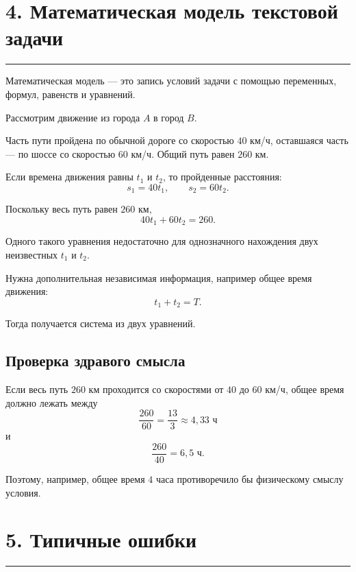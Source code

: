 \documentclass[a4paper,12pt]{article}
\newcommand{\sectionline}{%
  \par
  \noindent
  \color{accent}\rule{\linewidth}{0.45pt}
  \color{textgray}
  \par
}
\begin{document}
\section*{4. Математическая модель текстовой задачи}
\sectionline

Математическая модель --- это запись условий задачи с помощью переменных, формул, равенств и уравнений.

Рассмотрим движение из города $A$ в город $B$.

Часть пути пройдена по обычной дороге со скоростью $40$ км/ч, оставшаяся часть --- по шоссе со скоростью $60$ км/ч. Общий путь равен $260$ км.

Если времена движения равны $t_1$ и $t_2$, то пройденные расстояния:
\[
s_1=40t_1,
\qquad
s_2=60t_2.
\]

Поскольку весь путь равен $260$ км,
\[
40t_1+60t_2=260.
\]

\begin{warningbox}
Одного такого уравнения недостаточно для однозначного нахождения двух неизвестных $t_1$ и $t_2$.

Нужна дополнительная независимая информация, например общее время движения:
\[
t_1+t_2=T.
\]

Тогда получается система из двух уравнений.
\end{warningbox}

\subsection*{Проверка здравого смысла}

Если весь путь $260$ км проходится со скоростями от $40$ до $60$ км/ч, общее время должно лежать между
\[
\frac{260}{60}
=
\frac{13}{3}
\approx
4{,}33\text{ ч}
\]
и
\[
\frac{260}{40}
=
6{,}5\text{ ч}.
\]

Поэтому, например, общее время $4$ часа противоречило бы физическому смыслу условия.

\section*{5. Типичные ошибки}
\sectionline
\end{document}
